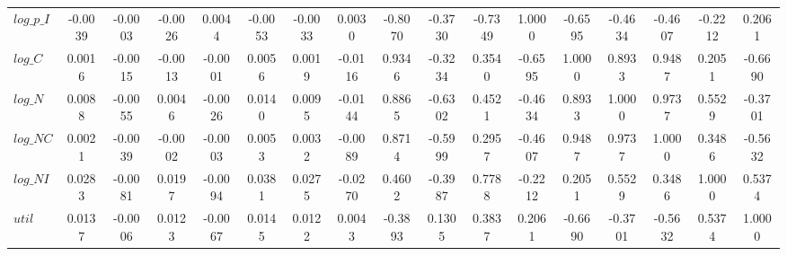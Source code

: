\begin{center}
\begin{longtable}{lcccccccccccccccc}
$log\_p\_I       $	 & 	           -0.0039	 & 	           -0.0003	 & 	           -0.0026	 & 	            0.0044	 & 	           -0.0053	 & 	           -0.0033	 & 	            0.0030	 & 	           -0.8070	 & 	           -0.3730	 & 	           -0.7349	 & 	            1.0000	 & 	           -0.6595	 & 	           -0.4634	 & 	           -0.4607	 & 	           -0.2212	 & 	            0.2061 \\ 
$log\_C          $	 & 	            0.0016	 & 	           -0.0015	 & 	           -0.0013	 & 	           -0.0001	 & 	            0.0056	 & 	            0.0019	 & 	           -0.0116	 & 	            0.9346	 & 	           -0.3234	 & 	            0.3540	 & 	           -0.6595	 & 	            1.0000	 & 	            0.8933	 & 	            0.9487	 & 	            0.2051	 & 	           -0.6690 \\ 
$log\_N          $	 & 	            0.0088	 & 	           -0.0055	 & 	            0.0046	 & 	           -0.0026	 & 	            0.0140	 & 	            0.0095	 & 	           -0.0144	 & 	            0.8865	 & 	           -0.6302	 & 	            0.4521	 & 	           -0.4634	 & 	            0.8933	 & 	            1.0000	 & 	            0.9737	 & 	            0.5529	 & 	           -0.3701 \\ 
$log\_NC         $	 & 	            0.0021	 & 	           -0.0039	 & 	           -0.0002	 & 	           -0.0003	 & 	            0.0053	 & 	            0.0032	 & 	           -0.0089	 & 	            0.8714	 & 	           -0.5999	 & 	            0.2957	 & 	           -0.4607	 & 	            0.9487	 & 	            0.9737	 & 	            1.0000	 & 	            0.3486	 & 	           -0.5632 \\ 
$log\_NI         $	 & 	            0.0283	 & 	           -0.0081	 & 	            0.0197	 & 	           -0.0094	 & 	            0.0381	 & 	            0.0275	 & 	           -0.0270	 & 	            0.4602	 & 	           -0.3987	 & 	            0.7788	 & 	           -0.2212	 & 	            0.2051	 & 	            0.5529	 & 	            0.3486	 & 	            1.0000	 & 	            0.5374 \\ 
${util}          $	 & 	            0.0137	 & 	           -0.0006	 & 	            0.0123	 & 	           -0.0067	 & 	            0.0145	 & 	            0.0122	 & 	            0.0043	 & 	           -0.3893	 & 	            0.1305	 & 	            0.3837	 & 	            0.2061	 & 	           -0.6690	 & 	           -0.3701	 & 	           -0.5632	 & 	            0.5374	 & 	            1.0000 \\ 
\end{longtable}
 \end{center}
